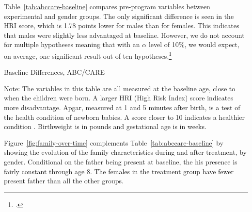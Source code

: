 Table~\ref{tab:abccare-baseline} compares pre-program variables between experimental and gender groups. The only significant difference is seen in the HRI score, which is 1.78 points lower for males than for females. This indicates that males were slightly less advantaged at baseline. However, we do not account for multiple hypotheses meaning that with an $\alpha$ level of 10\%, we would expect, on average, one significant result out of ten hypotheses.\footnote{\citet{Romano_Wolf_2005_JASA}.}

\begin{table}[H]
\centering
\caption{Baseline Differences, ABC/CARE}
\label{tab:abccare-baseline}
\begin{threeparttable}
	
\begin{tablenotes}
\footnotesize
\item Note: The variables in this table are all measured at the baseline age, close to when the children were born. A larger HRI (High Risk Index) score indicates more disadvantage. Apgar, measured at 1 and 5 minutes after birth, is a test of the health condition of newborn babies. A score closer to 10 indicates a healthier condition \citep{Apgar_1966_APGAR-Scoring_PCNA}. Birthweight is in pounds and gestational age is in weeks. 
\end{tablenotes}
\end{threeparttable}
\end{table}

Figure~\ref{fig:family-over-time} complements Table~\ref{tab:abccare-baseline} by showing the evolution of the family characteristics during and after treatment, by gender. Conditional on the father being present at baseline, the his presence is fairly constant through age 8. The females in the treatment group have fewer present father than all the other groups.

